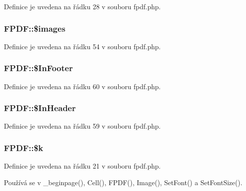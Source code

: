 Definice je uvedena na řádku 28 v souboru fpdf.\-php.

\hypertarget{class_f_p_d_f_afc8b2e219390a60499ed3d6a28b31f2d}{
\subsubsection[{\$images}]{\setlength{\rightskip}{0pt plus 5cm}F\-P\-D\-F\-::\$images}}\label{class_f_p_d_f_afc8b2e219390a60499ed3d6a28b31f2d}


Definice je uvedena na řádku 54 v souboru fpdf.\-php.

\hypertarget{class_f_p_d_f_a9550396e618abf65f024fb07b4c31bdd}{
\subsubsection[{\$\-In\-Footer}]{\setlength{\rightskip}{0pt plus 5cm}F\-P\-D\-F\-::\$\-In\-Footer}}\label{class_f_p_d_f_a9550396e618abf65f024fb07b4c31bdd}


Definice je uvedena na řádku 60 v souboru fpdf.\-php.

\hypertarget{class_f_p_d_f_ad826d8f87302ffc1b53c3af9b32509e2}{
\subsubsection[{\$\-In\-Header}]{\setlength{\rightskip}{0pt plus 5cm}F\-P\-D\-F\-::\$\-In\-Header}}\label{class_f_p_d_f_ad826d8f87302ffc1b53c3af9b32509e2}


Definice je uvedena na řádku 59 v souboru fpdf.\-php.

\hypertarget{class_f_p_d_f_adadc589358125e9865dc6565722b7a08}{
\subsubsection[{\$k}]{\setlength{\rightskip}{0pt plus 5cm}F\-P\-D\-F\-::\$k}}\label{class_f_p_d_f_adadc589358125e9865dc6565722b7a08}


Definice je uvedena na řádku 21 v souboru fpdf.\-php.



Používá se v \-\_\-beginpage(), Cell(), F\-P\-D\-F(), Image(), Set\-Font() a Set\-Font\-Size().

